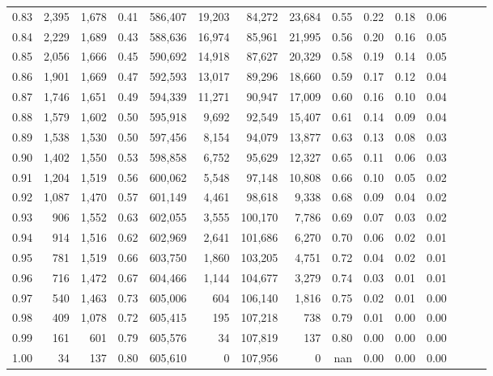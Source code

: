 \begin{tabular}{rrrrrrrrrrrrrrr}
0.83 &  2,395 &  1,678 &  0.41 &  586,407 &   19,203 &   84,272 &   23,684 &  0.55 &  0.22 &  0.18 &      0.06 \\
0.84 &  2,229 &  1,689 &  0.43 &  588,636 &   16,974 &   85,961 &   21,995 &  0.56 &  0.20 &  0.16 &      0.05 \\
0.85 &  2,056 &  1,666 &  0.45 &  590,692 &   14,918 &   87,627 &   20,329 &  0.58 &  0.19 &  0.14 &      0.05 \\
0.86 &  1,901 &  1,669 &  0.47 &  592,593 &   13,017 &   89,296 &   18,660 &  0.59 &  0.17 &  0.12 &      0.04 \\
0.87 &  1,746 &  1,651 &  0.49 &  594,339 &   11,271 &   90,947 &   17,009 &  0.60 &  0.16 &  0.10 &      0.04 \\
0.88 &  1,579 &  1,602 &  0.50 &  595,918 &    9,692 &   92,549 &   15,407 &  0.61 &  0.14 &  0.09 &      0.04 \\
0.89 &  1,538 &  1,530 &  0.50 &  597,456 &    8,154 &   94,079 &   13,877 &  0.63 &  0.13 &  0.08 &      0.03 \\
0.90 &  1,402 &  1,550 &  0.53 &  598,858 &    6,752 &   95,629 &   12,327 &  0.65 &  0.11 &  0.06 &      0.03 \\
0.91 &  1,204 &  1,519 &  0.56 &  600,062 &    5,548 &   97,148 &   10,808 &  0.66 &  0.10 &  0.05 &      0.02 \\
0.92 &  1,087 &  1,470 &  0.57 &  601,149 &    4,461 &   98,618 &    9,338 &  0.68 &  0.09 &  0.04 &      0.02 \\
0.93 &    906 &  1,552 &  0.63 &  602,055 &    3,555 &  100,170 &    7,786 &  0.69 &  0.07 &  0.03 &      0.02 \\
0.94 &    914 &  1,516 &  0.62 &  602,969 &    2,641 &  101,686 &    6,270 &  0.70 &  0.06 &  0.02 &      0.01 \\
0.95 &    781 &  1,519 &  0.66 &  603,750 &    1,860 &  103,205 &    4,751 &  0.72 &  0.04 &  0.02 &      0.01 \\
0.96 &    716 &  1,472 &  0.67 &  604,466 &    1,144 &  104,677 &    3,279 &  0.74 &  0.03 &  0.01 &      0.01 \\
0.97 &    540 &  1,463 &  0.73 &  605,006 &      604 &  106,140 &    1,816 &  0.75 &  0.02 &  0.01 &      0.00 \\
0.98 &    409 &  1,078 &  0.72 &  605,415 &      195 &  107,218 &      738 &  0.79 &  0.01 &  0.00 &      0.00 \\
0.99 &    161 &    601 &  0.79 &  605,576 &       34 &  107,819 &      137 &  0.80 &  0.00 &  0.00 &      0.00 \\
1.00 &     34 &    137 &  0.80 &  605,610 &        0 &  107,956 &        0 &   nan &  0.00 &  0.00 &      0.00 \\
\bottomrule
\end{tabular}
